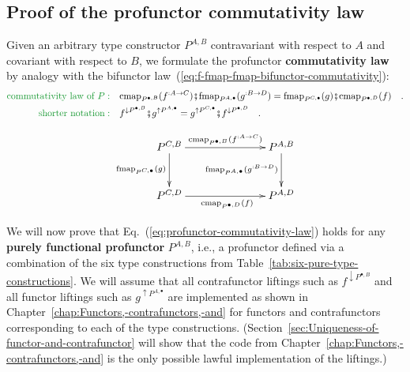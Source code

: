 \subsection{Proof of the profunctor commutativity law\label{subsec:Proof-of-the-profunctor-commutativity-law}}

Given an arbitrary type constructor $P^{A,B}$ contravariant with
respect to $A$ and covariant with respect to $B$, we formulate the
profunctor \textbf{commutativity law}
by analogy with the bifunctor law~(\ref{eq:f-fmap-fmap-bifunctor-commutativity}):
\begin{align}
{\color{greenunder}\text{commutativity law of }P:}\quad & \text{cmap}_{P^{\bullet,B}}(f^{:A\rightarrow C})\bef\text{fmap}_{P^{A,\bullet}}(g^{:B\rightarrow D})=\text{fmap}_{P^{C,\bullet}}(g)\bef\text{cmap}_{P^{\bullet,D}}(f)\quad.\nonumber \\
{\color{greenunder}\text{shorter notation}:}\quad & f^{\downarrow P^{\bullet,B}}\bef g^{\uparrow P^{A,\bullet}}=g^{\uparrow P^{C,\bullet}}\bef f^{\downarrow P^{\bullet,D}}\quad.\label{eq:profunctor-commutativity-law}
\end{align}

\begin{wrapfigure}{l}{0.38\columnwidth}%
\vspace{-1.7\baselineskip}
\[
\xymatrix{\xyScaleY{2.5pc}\xyScaleX{6.0pc}P^{C,B}\ar[r]\sp(0.55){\text{cmap}_{P^{\bullet,B}}(f^{:A\rightarrow C})~~~}\ar[d]\sb(0.45){\text{fmap}_{P^{C,\bullet}}(g)} & P^{A,B}\ar[d]\sb(0.45){\text{fmap}_{P^{A,\bullet}}(g^{:B\rightarrow D})}\\
P^{C,D}\ar[r]\sb(0.45){~~~~\text{cmap}_{P^{\bullet,D}}(f)} & P^{A,D}
}
\]

\vspace{-1.7\baselineskip}
\end{wrapfigure}%

We will now prove that Eq.~(\ref{eq:profunctor-commutativity-law})
holds for any \textbf{purely functional profunctor}
$P^{A,B}$, i.e., a profunctor defined via a combination of the six
type constructions from Table~\ref{tab:six-pure-type-constructions}.
We will assume that all contrafunctor liftings such as $f^{\downarrow P^{\bullet,B}}$
and all functor liftings such as $g^{\uparrow P^{A,\bullet}}$ are
implemented as shown in Chapter~\ref{chap:Functors,-contrafunctors,-and}
for functors and contrafunctors corresponding to each of the type
constructions. (Section~\ref{sec:Uniqueness-of-functor-and-contrafunctor}
will show that the code from Chapter~\ref{chap:Functors,-contrafunctors,-and}
is the only possible lawful implementation of the liftings.)

